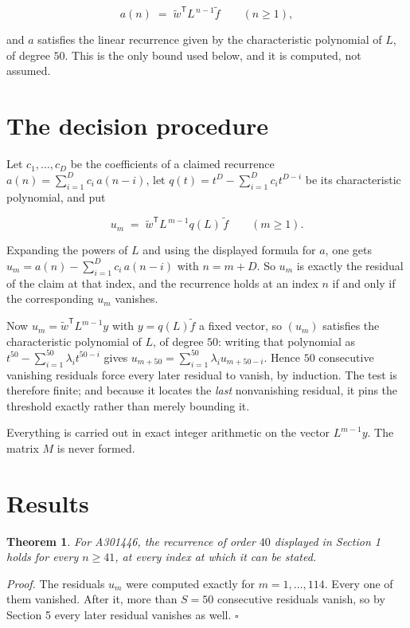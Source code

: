\documentclass[11pt]{article}
\newtheorem{theorem}{Theorem}
\theoremstyle{definition}
\begin{document}
\[a(n) \;=\; \tilde w^{\mathsf T} L^{\,n-1} \tilde f \qquad (n \ge 1),\]

and $a$ satisfies the linear recurrence given by the characteristic polynomial of $L$, of degree $50$. This is the only bound used below, and it is computed, not assumed.

\section{The decision procedure}

Let $c_1,\dots,c_D$ be the coefficients of a claimed recurrence $a(n) = \sum_{i=1}^{D} c_i\,a(n-i)$, let $q(t) = t^{D} - \sum_{i=1}^{D} c_i t^{D-i}$ be its characteristic polynomial, and put

\[u_m \;=\; \tilde w^{\mathsf T} L^{\,m-1} q(L)\,\tilde f \qquad (m \ge 1).\]

Expanding the powers of $L$ and using the displayed formula for $a$, one gets $u_m = a(n) - \sum_{i=1}^{D} c_i\,a(n-i)$ with $n = m + D$. So $u_m$ is exactly the residual of the claim at that index, and the recurrence holds at an index $n$ if and only if the corresponding $u_m$ vanishes.

Now $u_m = \tilde w^{\mathsf T} L^{m-1} y$ with $y = q(L)\tilde f$ a fixed vector, so $(u_m)$ satisfies the characteristic polynomial of $L$, of degree $50$: writing that polynomial as $t^{50} - \sum_{i=1}^{50} \lambda_i t^{50-i}$ gives $u_{m+50} = \sum_{i=1}^{50} \lambda_i u_{m+50-i}$. Hence $50$ consecutive vanishing residuals force every later residual to vanish, by induction. The test is therefore finite; and because it locates the {\itshape last} nonvanishing residual, it pins the threshold exactly rather than merely bounding it.

Everything is carried out in exact integer arithmetic on the vector $L^{m-1}y$. The matrix $M$ is never formed.

\section{Results}

\begin{theorem} For A301446, the recurrence of order $40$ displayed in Section 1 holds for every $n \ge 41$, at every index at which it can be stated.\end{theorem}

{\itshape Proof.} The residuals $u_m$ were computed exactly for $m = 1,\dots,114$. Every one of them vanished. After it, more than $S = 50$ consecutive residuals vanish, so by Section 5 every later residual vanishes as well. $\square$
\end{document}
